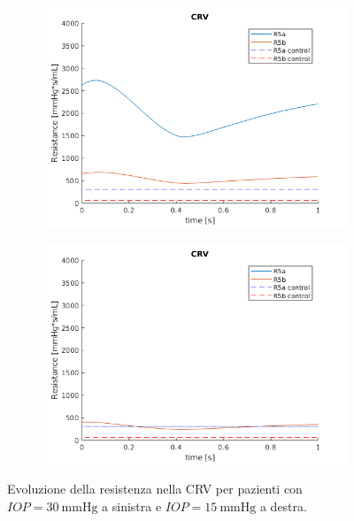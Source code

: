 \documentclass{article}
\begin{document}
\begin{figure}[h]
\begin{subfigure}{.5\textwidth}
  \centering
  \includegraphics[width=1.0\linewidth]{Pictures/IOP30_part1/CRV_30.png}
\end{subfigure}
\begin{subfigure}{.5\textwidth}
  \centering
  \includegraphics[width=1.0\linewidth]{Pictures/IOP15_part1/CRV_15.png}
\end{subfigure}
\caption{Evoluzione della resistenza nella CRV per pazienti con $IOP = \SI{30}{\mmHg}$ a sinistra e $IOP = \SI{15}{\mmHg}$ a destra.}
\label{CRV1530}
\end{figure}
\end{document}
